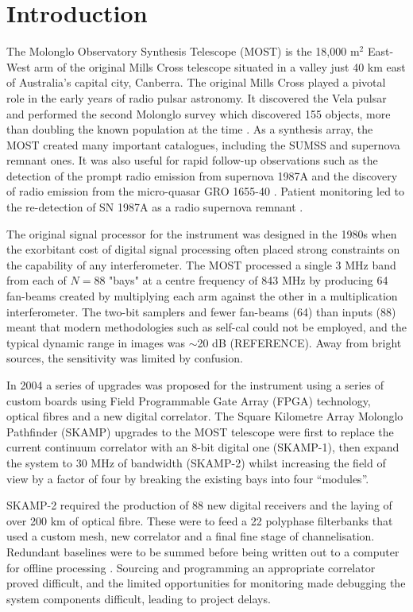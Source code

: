 \section{Introduction} 
The Molonglo Observatory Synthesis Telescope (MOST) is the 18,000 m$^2$ East-West arm of the original Mills Cross telescope situated in a valley just 40 km east of Australia's capital city, Canberra. The original Mills Cross played a pivotal role in the early years of radio pulsar astronomy. It discovered the Vela pulsar \citep{LARGE_1968} and performed the second Molonglo survey which discovered 155 objects, more than doubling the known population at the time \citep{Manchester_1978}. As a synthesis array, the MOST created many important catalogues, including the SUMSS \citep{Bock_1999,Mauch_2003} and supernova remnant \citep{Whiteoak_1996} ones. It was also useful for rapid follow-up observations such as the detection of the prompt radio emission from supernova 1987A \citep{Turtle_1987} and the discovery of radio emission from the micro-quasar GRO 1655-40 \citep{Tingay_1995}. Patient monitoring led to the re-detection of SN 1987A as a radio supernova remnant \citep{Staveley_Smith_1992}.

The original signal processor \citep{Robertson_1991} for the instrument was designed in the 1980s when the exorbitant cost of digital signal processing often placed strong constraints on the capability of any interferometer. The MOST processed a single 3 MHz band from each of $N=88$ "bays" at a centre frequency of 843 MHz by producing 64 fan-beams created by multiplying each arm against the other in a multiplication interferometer. The two-bit samplers and fewer fan-beams (64) than inputs (88) meant that modern methodologies such as self-cal could not be employed, and the typical dynamic range in images was $\sim$20 dB (REFERENCE). Away from bright sources, the sensitivity was limited by confusion.

In 2004 a series of upgrades was proposed for the instrument using a series of custom boards using Field Programmable Gate Array (FPGA) technology, optical fibres and a new digital correlator\citep{Adams_2004}. The Square Kilometre Array Molonglo Pathfinder (SKAMP) upgrades to the MOST telescope were first to replace the current continuum correlator with an 8-bit digital one (SKAMP-1), then expand the system to 30 MHz of bandwidth (SKAMP-2) whilst increasing the field of view by a factor of four by breaking the existing bays into four ``modules''.

SKAMP-2 required the production of 88 new digital receivers and the laying of over 200 km of optical fibre. These were to feed a 22 polyphase filterbanks that used a custom mesh, new correlator and a final fine stage of channelisation. Redundant baselines were to be summed before being written out to a computer for offline processing \citep{Adams_2004}. Sourcing and programming an appropriate correlator proved difficult, and the limited opportunities for monitoring made debugging the system components difficult, leading to project delays.

